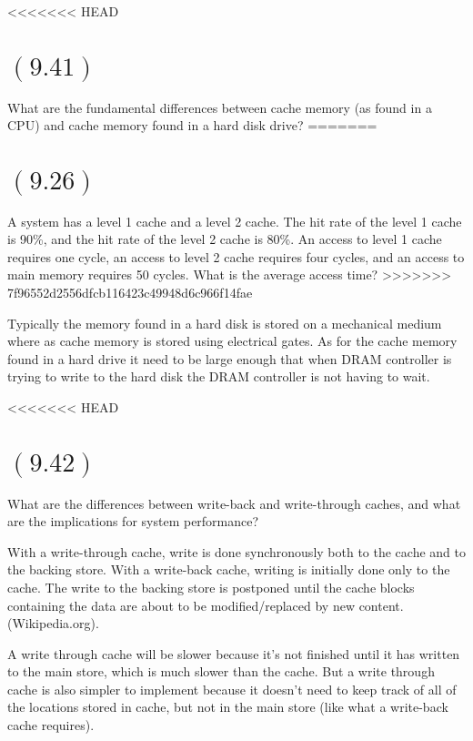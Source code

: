 \documentclass[letterpaper,12pt,titlepage]{article}
\begin{document}
<<<<<<< HEAD
\section*{$(9.41)$} What are the fundamental differences between cache memory (as found in a CPU) and cache memory found in a hard disk drive?
=======
\section*{$(9.26)$} A system has a level 1 cache and a level 2 cache. The hit rate of the level 1 cache is 90\%, and the hit rate of the level 2 cache is 80\%. An access to level 1 cache requires one cycle, an access to level 2 cache requires four cycles, and an access to main memory requires 50 cycles. What is the average access time?
>>>>>>> 7f96552d2556dfcb116423c49948d6c966f14fae

\begin{mdframed}[style=MyFrame]
Typically the memory found in a hard disk is stored on a mechanical medium where as cache memory is stored using electrical gates. As for the cache memory found in a hard drive it need to be large enough that when DRAM controller is trying to write to the hard disk the DRAM controller is not having to wait.
\end{mdframed}

<<<<<<< HEAD
\section*{$(9.42)$} What are the differences between write-back and write-through caches, and what are the implications for system performance? 

\begin{mdframed}[style=MyFrame]
With a write-through cache, write is done synchronously both to the cache and to the backing store.
With a write-back cache, writing is initially done only to the cache. The write to the backing store is postponed until the cache blocks containing the data are about to be modified/replaced by new content. (Wikipedia.org).

A write through cache will be slower because it's not finished until it has written to the main store, which is much slower than the cache.  But a write through cache is also simpler to implement because it doesn't need to keep track of all of the locations stored in cache, but not in the main store (like what a write-back cache requires). 
\end{mdframed}
\end{document}
